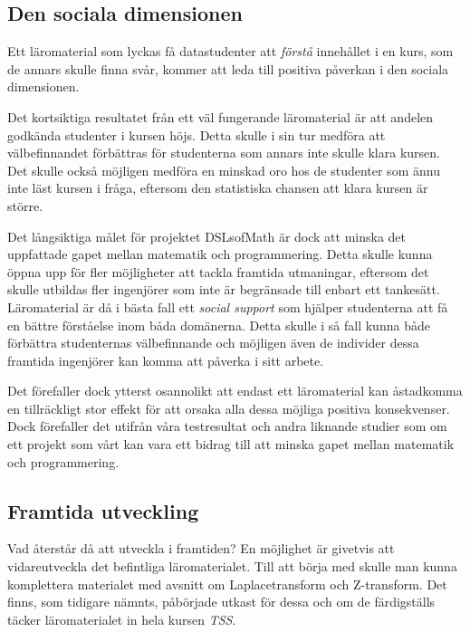 \documentclass[12pt,a4paper,twoside,openright]{article}
\begin{document}
\subsection{Den sociala dimensionen}

Ett läromaterial som lyckas få datastudenter att \emph{förstå}
innehållet i en kurs, som de annars skulle finna svår, kommer att leda
till positiva påverkan i den sociala dimensionen. %

Det kortsiktiga resultatet från ett väl fungerande läromaterial är att
andelen godkända studenter i kursen höjs. Detta skulle i sin tur
medföra att välbefinnandet förbättras för studenterna som annars inte
skulle klara kursen.  Det skulle också möjligen medföra en minskad oro
hos de studenter som ännu inte läst kursen i fråga, eftersom den
statistiska chansen att klara kursen är större.

Det långsiktiga målet för projektet DSLsofMath är dock att minska det
uppfattade gapet mellan matematik och programmering. %
Detta skulle kunna öppna upp för fler möjligheter att
tackla framtida utmaningar, eftersom det skulle utbildas fler
ingenjörer som inte är begränsade till enbart ett tankesätt.
Läromaterial är då i bästa fall ett \emph{social support} som hjälper
studenterna att få en bättre förståelse inom båda domänerna. Detta
skulle i så fall kunna både förbättra studenternas välbefinnande och
möjligen även de individer dessa framtida ingenjörer kan komma att
påverka i sitt arbete.

Det förefaller dock ytterst osannolikt att endast ett läromaterial
kan åstadkomma en tillräckligt stor effekt för att orsaka alla
dessa möjliga positiva konsekvenser. Dock förefaller det utifrån
våra testresultat och andra liknande studier som om ett
projekt som vårt kan vara ett bidrag till att minska
gapet mellan matematik och programmering.

\subsection{Framtida utveckling}
Vad återstår då att utveckla i framtiden? En möjlighet är givetvis att
vidareutveckla det befintliga läromaterialet. Till att börja med
skulle man kunna komplettera materialet med avsnitt om
Laplacetransform och Z-transform. Det finns, som tidigare nämnts,
påbörjade utkast för dessa och om de färdigställs täcker
läromaterialet in hela kursen \textit{TSS}.
\end{document}
